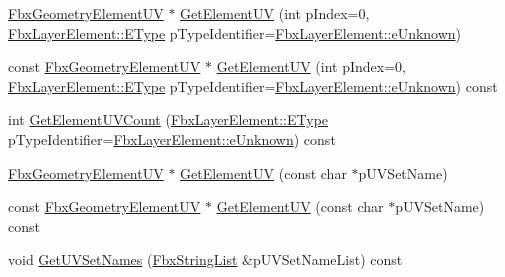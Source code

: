 \begin{DoxyCompactItemize}
\item 
\hyperlink{fbxlayer_8h_a12413531f4bb2c482e3ddbd59e3417e5}{Fbx\+Geometry\+Element\+UV} $\ast$ \hyperlink{class_fbx_geometry_base_a47702a12ebe438343757fbbe2ebd41d3}{Get\+Element\+UV} (int p\+Index=0, \hyperlink{class_fbx_layer_element_a8c95c5cd880b56c776acd379bd86f42c}{Fbx\+Layer\+Element\+::\+E\+Type} p\+Type\+Identifier=\hyperlink{class_fbx_layer_element_a8c95c5cd880b56c776acd379bd86f42cab3768744dc14ef9fcf6631d3ade97e54}{Fbx\+Layer\+Element\+::e\+Unknown})
\item 
const \hyperlink{fbxlayer_8h_a12413531f4bb2c482e3ddbd59e3417e5}{Fbx\+Geometry\+Element\+UV} $\ast$ \hyperlink{class_fbx_geometry_base_aacf39d3a8ff304383999ffff1500598f}{Get\+Element\+UV} (int p\+Index=0, \hyperlink{class_fbx_layer_element_a8c95c5cd880b56c776acd379bd86f42c}{Fbx\+Layer\+Element\+::\+E\+Type} p\+Type\+Identifier=\hyperlink{class_fbx_layer_element_a8c95c5cd880b56c776acd379bd86f42cab3768744dc14ef9fcf6631d3ade97e54}{Fbx\+Layer\+Element\+::e\+Unknown}) const
\item 
int \hyperlink{class_fbx_geometry_base_a617a6e3bcbceb4489e2db1a386f9640b}{Get\+Element\+U\+V\+Count} (\hyperlink{class_fbx_layer_element_a8c95c5cd880b56c776acd379bd86f42c}{Fbx\+Layer\+Element\+::\+E\+Type} p\+Type\+Identifier=\hyperlink{class_fbx_layer_element_a8c95c5cd880b56c776acd379bd86f42cab3768744dc14ef9fcf6631d3ade97e54}{Fbx\+Layer\+Element\+::e\+Unknown}) const
\item 
\hyperlink{fbxlayer_8h_a12413531f4bb2c482e3ddbd59e3417e5}{Fbx\+Geometry\+Element\+UV} $\ast$ \hyperlink{class_fbx_geometry_base_ac6fda0d204a28b5e67ef46b9bce6e288}{Get\+Element\+UV} (const char $\ast$p\+U\+V\+Set\+Name)
\item 
const \hyperlink{fbxlayer_8h_a12413531f4bb2c482e3ddbd59e3417e5}{Fbx\+Geometry\+Element\+UV} $\ast$ \hyperlink{class_fbx_geometry_base_a31f84a19326288aa8315fdbbec39a90a}{Get\+Element\+UV} (const char $\ast$p\+U\+V\+Set\+Name) const
\item 
void \hyperlink{class_fbx_geometry_base_a65147440e2f577ab7f5b60e228881641}{Get\+U\+V\+Set\+Names} (\hyperlink{class_fbx_string_list}{Fbx\+String\+List} \&p\+U\+V\+Set\+Name\+List) const
\end{DoxyCompactItemize}
